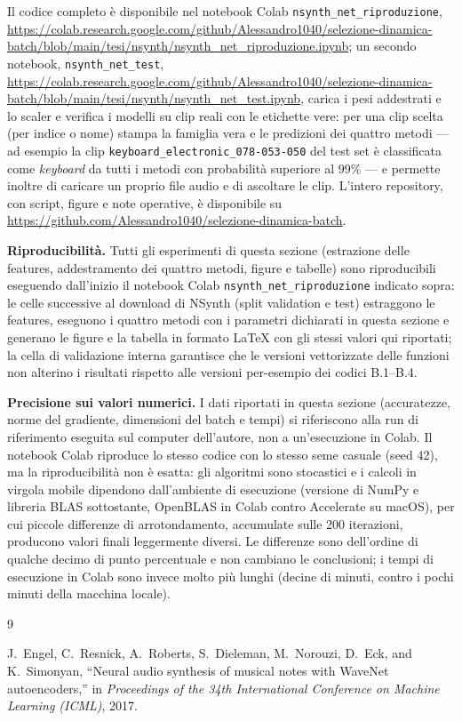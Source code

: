 \documentclass[a4paper,12pt]{article}
\numberwithin{equation}{section}
\numberwithin{figure}{section}
\numberwithin{table}{section}
\begin{document}
Il codice completo è disponibile nel notebook Colab
\texttt{nsynth\_net\_riproduzione},
\url{https://colab.research.google.com/github/Alessandro1040/selezione-dinamica-batch/blob/main/tesi/nsynth/nsynth_net_riproduzione.ipynb};
un secondo notebook, \texttt{nsynth\_net\_test},
\url{https://colab.research.google.com/github/Alessandro1040/selezione-dinamica-batch/blob/main/tesi/nsynth/nsynth_net_test.ipynb},
carica i pesi addestrati e lo scaler e verifica i modelli su clip reali con le
etichette vere: per una clip scelta (per indice o nome) stampa la famiglia vera
e le predizioni dei quattro metodi --- ad esempio la clip
\texttt{keyboard\_electronic\_078-053-050} del test set è classificata come
\emph{keyboard} da tutti i metodi con probabilità superiore al 99\% --- e
permette inoltre di caricare un proprio file audio e di ascoltare le clip.
L'intero repository, con script, figure e note operative, è disponibile su
\url{https://github.com/Alessandro1040/selezione-dinamica-batch}.

\textbf{Riproducibilità.} Tutti gli esperimenti di questa sezione (estrazione
delle features, addestramento dei quattro metodi, figure e tabelle) sono
riproducibili eseguendo dall'inizio il notebook Colab
\texttt{nsynth\_net\_riproduzione} indicato sopra: le celle successive al
download di NSynth (split validation e test) estraggono le features, eseguono i
quattro metodi con i parametri dichiarati in questa sezione e generano le
figure e la tabella in formato LaTeX con gli stessi valori qui riportati; la
cella di validazione interna garantisce che le versioni vettorizzate delle
funzioni non alterino i risultati rispetto alle versioni per-esempio dei codici
B.1--B.4.

\textbf{Precisione sui valori numerici.} I dati riportati in questa sezione
(accuratezze, norme del gradiente, dimensioni del batch e tempi) si riferiscono
alla run di riferimento eseguita sul computer dell'autore, non a un'esecuzione
in Colab. Il notebook Colab riproduce lo stesso codice con lo stesso seme
casuale (seed 42), ma la riproducibilità non è esatta: gli algoritmi sono
stocastici e i calcoli in virgola mobile dipendono dall'ambiente di esecuzione
(versione di NumPy e libreria BLAS sottostante, OpenBLAS in Colab contro
Accelerate su macOS), per cui piccole differenze di arrotondamento, accumulate
sulle 200 iterazioni, producono valori finali leggermente diversi. Le
differenze sono dell'ordine di qualche decimo di punto percentuale e non
cambiano le conclusioni; i tempi di esecuzione in Colab sono invece molto più
lunghi (decine di minuti, contro i pochi minuti della macchina locale).






\begin{thebibliography}{9}

J.~Engel, C.~Resnick, A.~Roberts, S.~Dieleman, M.~Norouzi, D.~Eck, and
K.~Simonyan,
``Neural audio synthesis of musical notes with WaveNet autoencoders,''
in \textit{Proceedings of the 34th International Conference on Machine
Learning (ICML)}, 2017.

\end{thebibliography}
\end{document}
